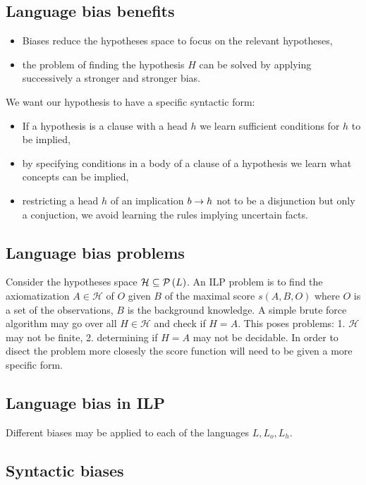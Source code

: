 \subsection{Language bias benefits}
\begin{itemize}
\item Biases reduce the hypotheses space to focus on the relevant hypotheses,
\item the problem of finding the hypothesis $H$ can be solved by applying successively a stronger and stronger bias.
\end{itemize}
We want our hypothesis to have a specific syntactic form:
\begin{itemize}
\item If a hypothesis is a clause with a head $h$ we learn sufficient conditions for $h$ to be implied,
\item by specifying conditions in a body of a clause of a hypothesis we learn what concepts can be implied,
\item restricting a head $h$ of an implication $b \to h$ not to be a disjunction but only a conjuction, we avoid learning the rules implying uncertain facts.
\end{itemize}

\subsection{Language bias problems}
Consider the hypotheses space $\mathcal{H} \subseteq \mathcal{P} \left({ L }\right)$. An ILP problem is to find the axiomatization $A \in \mathcal{H}$ of $O$ given $B$ of the maximal score $s(A,B,O)$ where $O$ is a set of the observations, $B$ is the background knowledge.
A simple brute force algorithm may go over all $H \in \mathcal{H}$ and check if $H=A$. This poses problems:
1. $\mathcal{H}$ may not be finite,
2. determining if $H=A$ may not be decidable.
In order to disect the problem more closesly the score function will need to be given a more specific form.

\subsection{Language bias in ILP}
Different biases may be applied to each of the languages $L, L_o, L_h$. 

\subsection{Syntactic biases}

